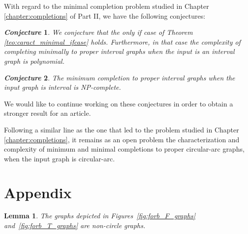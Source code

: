 \documentclass[12pt]{book}
\theoremstyle{plain}
\newtheorem{conj}{\textit{Conjecture}}[chapter]
\newtheorem{lema}[teo]{Lemma}
\theoremstyle{remark}
\begin{document}
With regard to the minimal completion problem studied in Chapter \ref{chapter:completions} of Part II, we have the following conjectures:

\begin{conj}
	We conjecture that the only if case of Theorem \ref{teo:caract_minimal_ifcase} holds. Furthermore, in that case the complexity of completing minimally to proper interval graphs when the input is an interval graph is polynomial.
\end{conj}

\begin{conj}
The minimum completion to proper interval graphs when the input graph is interval is NP-complete.
\end{conj}

We would like to continue working on these conjectures in order to obtain a stronger result for an article. 

Following a similar line as the one that led to the problem studied in Chapter \ref{chapter:completions}, it remains as an open problem the characterization and complexity of minimum and minimal completions to proper circular-arc graphs, when the input graph is circular-arc.


\chapter*{Appendix}


\begin{lema}\label{lema:no_son_circle}
The graphs depicted in Figures~\ref{fig:forb_F_graphs} and~\ref{fig:forb_T_graphs} are non-circle graphs.
\end{lema}
\end{document}
